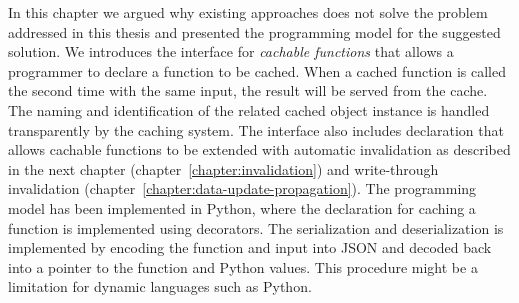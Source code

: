In this chapter we argued why existing approaches does not solve the problem addressed in this thesis and presented the programming model for the suggested solution. We introduces the interface for \emph{cachable functions} that allows a programmer to declare a function to be cached. When a cached function is called the second time with the same input, the result will be served from the cache. The naming and identification of the related cached object instance is handled transparently by the caching system. The interface also includes declaration that allows cachable functions to be extended with automatic invalidation as described in the next chapter (chapter~\ref{chapter:invalidation}) and write-through invalidation (chapter~\ref{chapter:data-update-propagation}).
The programming model has been implemented in Python, where the declaration for caching a function is implemented using decorators. The serialization and deserialization is implemented by encoding the function and input into JSON and decoded back into a pointer to the function and Python values. This procedure might be a limitation for dynamic languages such as Python.


